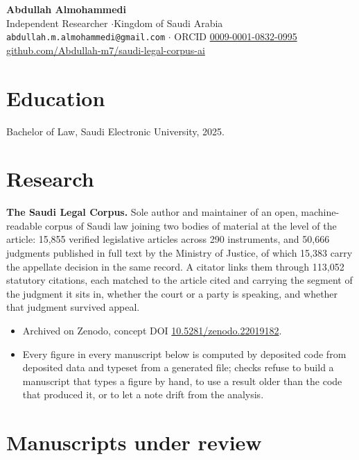 \documentclass[11pt]{article}
\begin{document}
\begin{center}
{\Large\bfseries Abdullah Almohammedi}\\[3pt]
Independent Researcher \quad$\cdot$\quad Kingdom of Saudi Arabia\\
\texttt{abdullah.m.almohammedi@gmail.com} \quad$\cdot$\quad
ORCID \href{https://orcid.org/0009-0001-0832-0995}{0009-0001-0832-0995}\\
\href{https://github.com/Abdullah-m7/saudi-legal-corpus-ai}{github.com/Abdullah-m7/saudi-legal-corpus-ai}
\end{center}

\section{Education}

Bachelor of Law, Saudi Electronic University, 2025.

\section{Research}

\textbf{The Saudi Legal Corpus.} Sole author and maintainer of an open,
machine-readable corpus of Saudi law joining two bodies of material at the
level of the article: 15,855 verified legislative articles across 290
instruments, and 50,666 judgments published in full text by the Ministry of
Justice, of which 15,383 carry the appellate decision in the same record. A
citator links them through 113,052 statutory citations, each matched to the
article cited and carrying the segment of the judgment it sits in, whether the
court or a party is speaking, and whether that judgment survived appeal.

\begin{itemize}
\item Archived on Zenodo, concept DOI
      \href{https://doi.org/10.5281/zenodo.22019182}{10.5281/zenodo.22019182}.
\item Every figure in every manuscript below is computed by deposited code
      from deposited data and typeset from a generated file; checks refuse to
      build a manuscript that types a figure by hand, to use a result older
      than the code that produced it, or to let a note drift from the analysis.
\end{itemize}

\section{Manuscripts under review}
\end{document}
